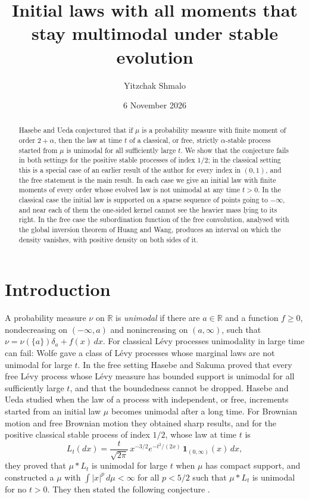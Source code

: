 \documentclass[11pt]{amsart}
\title[Stable evolution need not become unimodal]{Initial laws with all moments that stay multimodal under stable evolution}
\author{Yitzchak Shmalo}
\date{6 November 2026}
\theoremstyle{definition}
\theoremstyle{remark}
\numberwithin{equation}{section}
\newcommand{\R}{\mathbb{R}}
\begin{document}
\begin{abstract}
Hasebe and Ueda conjectured that if $\mu$ is a probability measure with finite moment of order $2+\alpha$, then the law at time $t$ of a classical, or free, strictly $\alpha$-stable process started from $\mu$ is unimodal for all sufficiently large $t$. We show that the conjecture fails in both settings for the positive stable processes of index $1/2$; in the classical setting this is a special case of an earlier result of the author for every index in $(0,1)$, and the free statement is the main result. In each case we give an initial law with finite moments of every order whose evolved law is not unimodal at any time $t>0$. In the classical case the initial law is supported on a sparse sequence of points going to $-\infty$, and near each of them the one-sided kernel cannot see the heavier mass lying to its right. In the free case the subordination function of the free convolution, analysed with the global inversion theorem of Huang and Wang, produces an interval on which the density vanishes, with positive density on both sides of it.
\end{abstract}
\maketitle

\section{Introduction}\label{sec:intro}

A probability measure $\nu$ on $\R$ is \emph{unimodal} if there are $a\in\R$ and a function $f\ge0$, nondecreasing on $(-\infty,a)$ and nonincreasing on $(a,\infty)$, such that $\nu=\nu(\{a\})\delta_a+f(x)\,dx$. For classical L\'evy processes unimodality in large time can fail: Wolfe \cite{W78} gave a class of L\'evy processes whose marginal laws are not unimodal for large $t$. In the free setting Hasebe and Sakuma \cite{HS17} proved that every free L\'evy process whose L\'evy measure has bounded support is unimodal for all sufficiently large $t$, and that the boundedness cannot be dropped. Hasebe and Ueda \cite{HU18} studied when the law of a process with independent, or free, increments started from an initial law $\mu$ becomes unimodal after a long time. For Brownian motion and free Brownian motion they obtained sharp results, and for the positive classical stable process of index $1/2$, whose law at time $t$ is
\begin{equation}\label{eq:levy}
L_t(dx)=\frac{t}{\sqrt{2\pi}}\,x^{-3/2}e^{-t^2/(2x)}\,\mathbf 1_{(0,\infty)}(x)\,dx ,
\end{equation}
they proved that $\mu*L_t$ is unimodal for large $t$ when $\mu$ has compact support, and constructed a $\mu$ with $\int|x|^p\,d\mu<\infty$ for all $p<5/2$ such that $\mu*L_t$ is unimodal for no $t>0$. They then stated the following conjecture \cite[Conjecture~5.5]{HU18}.
\end{document}
